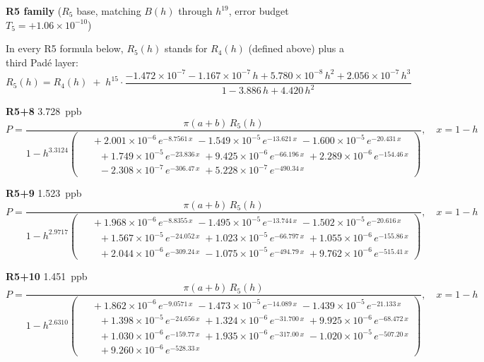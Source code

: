 \documentclass[12pt]{article}
\begin{document}
\medskip\noindent\textbf{R5 family} ($R_5$ base, matching $B(h)$ through $h^{19}$, error budget $T_5 = +1.06 \times 10^{-10}$)\nopagebreak

\noindent In every R5 formula below, $R_5(h)$ stands for $R_4(h)$ (defined above) plus a third Pad\'e layer:
\[
R_5(h) = R_4(h) \;+\; h^{15}\!\cdot\!\frac{-1.472{\times}10^{-7} - 1.167{\times}10^{-7}\,h + 5.780{\times}10^{-8}\,h^2 + 2.056{\times}10^{-7}\,h^3}
       {1 - 3.886\,h + 4.420\,h^2}
\]

\noindent\textbf{R5+8} 3.728~ppb\nopagebreak
\begin{equation*}
P = \frac{\pi(a{+}b)\,R_5(h)}{1 - h^{3.3124}\!\left(\!\begin{aligned}
  &\; +2.001{\times}10^{-6}\,e^{-8.7561\,x} \; -1.549{\times}10^{-5}\,e^{-13.621\,x} \; -1.600{\times}10^{-5}\,e^{-20.431\,x} \\[-3pt]
  &\quad +1.749{\times}10^{-5}\,e^{-23.836\,x} \; +9.425{\times}10^{-6}\,e^{-66.196\,x} \; +2.289{\times}10^{-6}\,e^{-154.46\,x} \\[-3pt]
  &\quad -2.308{\times}10^{-7}\,e^{-306.47\,x} \; +5.228{\times}10^{-7}\,e^{-490.34\,x}
\end{aligned}\!\right)}, \quad x = 1{-}h
\end{equation*}

\noindent\textbf{R5+9} 1.523~ppb\nopagebreak
\begin{equation*}
P = \frac{\pi(a{+}b)\,R_5(h)}{1 - h^{2.9717}\!\left(\!\begin{aligned}
  &\; +1.968{\times}10^{-6}\,e^{-8.8355\,x} \; -1.495{\times}10^{-5}\,e^{-13.744\,x} \; -1.502{\times}10^{-5}\,e^{-20.616\,x} \\[-3pt]
  &\quad +1.567{\times}10^{-5}\,e^{-24.052\,x} \; +1.023{\times}10^{-5}\,e^{-66.797\,x} \; +1.055{\times}10^{-6}\,e^{-155.86\,x} \\[-3pt]
  &\quad +2.044{\times}10^{-6}\,e^{-309.24\,x} \; -1.075{\times}10^{-5}\,e^{-494.79\,x} \; +9.762{\times}10^{-6}\,e^{-515.41\,x}
\end{aligned}\!\right)}, \quad x = 1{-}h
\end{equation*}

\noindent\textbf{R5+10} 1.451~ppb\nopagebreak
\begin{equation*}
P = \frac{\pi(a{+}b)\,R_5(h)}{1 - h^{2.6310}\!\left(\!\begin{aligned}
  &\; +1.862{\times}10^{-6}\,e^{-9.0571\,x} \; -1.473{\times}10^{-5}\,e^{-14.089\,x} \; -1.439{\times}10^{-5}\,e^{-21.133\,x} \\[-3pt]
  &\quad +1.398{\times}10^{-5}\,e^{-24.656\,x} \; +1.324{\times}10^{-6}\,e^{-31.700\,x} \; +9.925{\times}10^{-6}\,e^{-68.472\,x} \\[-3pt]
  &\quad +1.030{\times}10^{-6}\,e^{-159.77\,x} \; +1.935{\times}10^{-6}\,e^{-317.00\,x} \; -1.020{\times}10^{-5}\,e^{-507.20\,x} \\[-3pt]
  &\quad +9.260{\times}10^{-6}\,e^{-528.33\,x}
\end{aligned}\!\right)}, \quad x = 1{-}h
\end{equation*}
\end{document}
